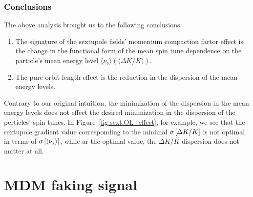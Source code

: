 \documentclass[]{elsarticle}
\newcommand{\D}{\Delta}
\newcommand{\SD}[1]{\sigma\bkt*{#1}}
\newcommand{\avg}[1]{\langle{#1}\rangle}
\begin{document}
\subsubsection{Conclusions}
The above analysis brought us to the following conclusions:
\begin{enumerate}[(1)]
\item The signature of the sextupole fields' momentum compaction factor effect is the change in the functional
  form of the mean spin tune dependence on the particle's mean energy level $\avg{\nu_s}(\avg{\D K/K})$.
  \item The pure orbit length effect is the reduction in the dispersion of the mean energy levels.
\end{enumerate}

Contrary to our original intuition, the minimization of the dispersion in the mean energy levels does not
effect the desired minimization in the dispersion of the perticles' spin tunes.
In Figure~\ref{fig:sext:OL_effect}, for example, we see that the sextupole gradient value corresponding to the
minimal $\SD{\D K/K}$ is not optimal in terms of $\SD{\avg{\nu_s}}$, while ar the optimal value,
the $\D K/K$ dispersion does not matter at all.


\section{MDM faking signal}
\end{document}
